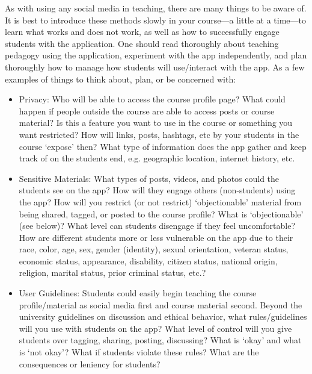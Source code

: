 As with using any social media in teaching, there are many things to be aware of. It is best to introduce these methods slowly in your course---a little at a time---to learn what works and does not work, as well as how to successfully engage students with the application. One should read thoroughly about teaching pedagogy using the application, experiment with the app independently, and plan thoroughly how to manage how students will use/interact with the app. As a few examples of things to think about, plan, or be concerned with:

	\begin{itemize}
	\item Privacy: Who will be able to access the course profile page? What could happen if people outside the course are able to access posts or course material? Is this a feature you want to use in the course or something you want restricted? How will links, posts, hashtags, etc by your students in the course `expose' then? What type of information does the app gather and keep track of on the students end, e.g. geographic location, internet history, etc. 
	
	\item Sensitive Materials: What types of posts, videos, and photos could the students see on the app? How will they engage others (non-students) using the app? How will you restrict (or not restrict) `objectionable' material from being shared, tagged, or posted to the course profile? What is `objectionable' (see below)? What level can students disengage if they feel uncomfortable? How are different students more or less vulnerable on the app due to their race, color, age, sex, gender (identity), sexual orientation, veteran status, economic status, appearance, disability, citizen status, national origin, religion, marital status, prior criminal status, etc.? 
	
	\item User Guidelines: Students could easily begin teaching the course profile/material as social media first and course material second. Beyond the university guidelines on discussion and ethical behavior, what rules/guidelines will you use with students on the app? What level of control will you give students over tagging, sharing, posting, discussing? What is `okay' and what is `not okay'? What if students violate these rules? What are the consequences or leniency for students? 
	\end{itemize}

